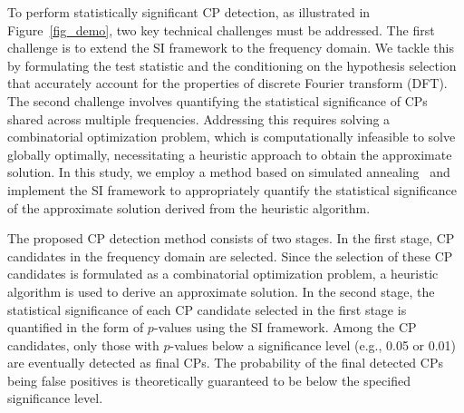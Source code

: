 To perform statistically significant CP detection, as illustrated in Figure~\ref{fig_demo}, two key technical challenges must be addressed.
%
The first challenge is to extend the SI framework to the frequency domain.
% 
We tackle this by formulating the test statistic and the conditioning on the hypothesis selection
that accurately account for the properties of discrete Fourier transform (DFT).
%
The second challenge involves quantifying the statistical significance of CPs shared across multiple frequencies.
%
Addressing this requires solving a combinatorial optimization problem, which is computationally infeasible to solve globally optimally, necessitating a heuristic approach to obtain the approximate solution.
%
In this study, we employ a method based on simulated annealing~\citep{kirkpatrick1983optimization, cerny1985thermodynamical} and implement the SI framework to appropriately quantify the statistical significance of the approximate solution derived from the heuristic algorithm. 
% 

The proposed CP detection method consists of two stages.
%
In the first stage, CP candidates in the frequency domain are selected.
%
Since the selection of these CP candidates is formulated as a combinatorial optimization problem, a heuristic algorithm is used to derive an approximate solution.
%
In the second stage, the statistical significance of each CP candidate selected in the first stage is quantified in the form of $p$-values using the SI framework.
%
Among the CP candidates, only those with $p$-values below a significance level (e.g., 0.05 or 0.01) are eventually detected as final CPs.
%
The probability of the final detected CPs being false positives is theoretically guaranteed to be below the specified significance level.

